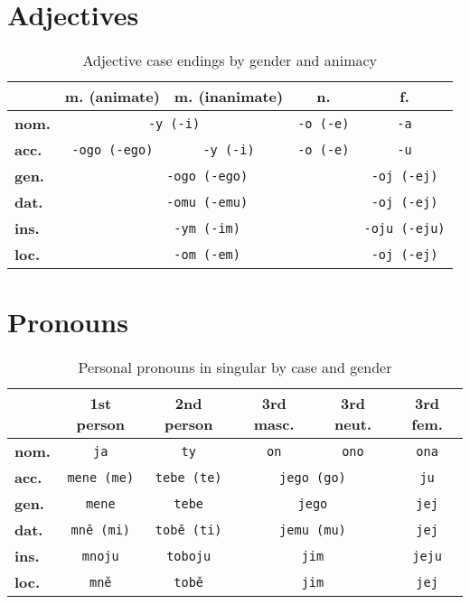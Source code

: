 \documentclass{article}
\begin{document}
\section*{Adjectives}
\begin{table}[h!]
\centering
\renewcommand{\arraystretch}{1.3}
\begin{tabular}{|l|c|c|c|c|}
\hline
\textbf{} & \textbf{m. (animate)} & \textbf{m. (inanimate)} & \textbf{n.} & \textbf{f.} \\
\hline
\textbf{nom.} & \multicolumn{2}{c|}{\texttt{-y (-i)}} & \texttt{-o (-e)} & \texttt{-a} \\
\hline
\textbf{acc.} & \texttt{-ogo (-ego)} & \texttt{-y (-i)} & \texttt{-o (-e)} & \texttt{-u} \\
\hline
\textbf{gen.} & \multicolumn{3}{c|}{\texttt{-ogo (-ego)}} & \texttt{-oj (-ej)} \\
\hline
\textbf{dat.} & \multicolumn{3}{c|}{\texttt{-omu (-emu)}} & \texttt{-oj (-ej)} \\
\hline
\textbf{ins.} & \multicolumn{3}{c|}{\texttt{-ym (-im)}} & \texttt{-oju (-eju)} \\
\hline
\textbf{loc.} & \multicolumn{3}{c|}{\texttt{-om (-em)}} & \texttt{-oj (-ej)} \\
\hline
\end{tabular}
\caption{Adjective case endings by gender and animacy}
\end{table}
\section*{Pronouns}
\begin{table}[h!]
\centering
\renewcommand{\arraystretch}{1.3}
\begin{tabular}{|l|c|c|c|c|c|}
\hline
\textbf{} & \textbf{1st person} & \textbf{2nd person} & \textbf{3rd masc.} & \textbf{3rd neut.} & \textbf{3rd fem.} \\
\hline
\textbf{nom.} & \texttt{ja} & \texttt{ty} & \texttt{on} & \texttt{ono} & \texttt{ona} \\
\hline
\textbf{acc.} & \texttt{mene (me)} & \texttt{tebe (te)} & \multicolumn{2}{c|}{\texttt{jego (go)}} & \texttt{ju} \\
\hline
\textbf{gen.} & \texttt{mene} & \texttt{tebe} & \multicolumn{2}{c|}{\texttt{jego}} & \texttt{jej} \\
\hline
\textbf{dat.} & \texttt{mně (mi)} & \texttt{tobě (ti)} & \multicolumn{2}{c|}{\texttt{jemu (mu)}} & \texttt{jej} \\
\hline
\textbf{ins.} & \texttt{mnoju} & \texttt{toboju} & \multicolumn{2}{c|}{\texttt{jim}} & \texttt{jeju} \\
\hline
\textbf{loc.} & \texttt{mně} & \texttt{tobě} & \multicolumn{2}{c|}{\texttt{jim}} & \texttt{jej} \\
\hline
\end{tabular}
\caption{Personal pronouns in singular by case and gender}
\end{table}
\end{document}
